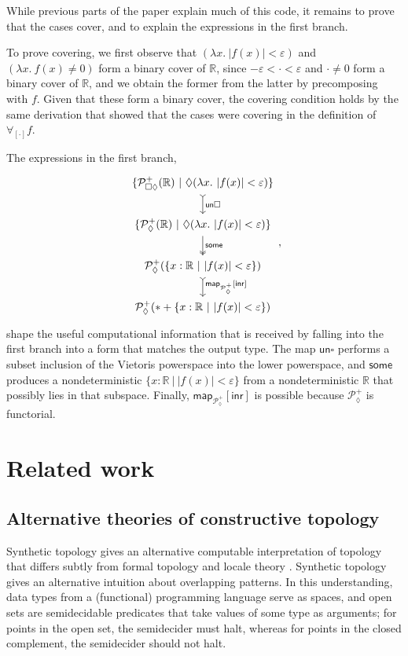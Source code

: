 \documentclass[conference]{IEEEtran}
\newcommand{\PLower}{\mathcal{P}_\lozenge}
\newcommand{\Viet}{\mathcal{P}_{\square\lozenge}}
\newcommand{\R}{\mathbb{R}}
\newcommand{\fun}[2]{\lambda {#1}.\  {#2}}
\newcommand{\suchthat}{\ |\ }
\newcommand{\One}{\ast}
\begin{document}
While previous parts of the paper explain much of this code, it remains to prove that the cases cover, and to explain the expressions in the first branch.

To prove covering, we first observe that  $(\fun{x}{|f(x)| < \varepsilon})$ and $(\fun{x}{f(x) \ne 0})$ form a binary cover of $\R$, since $- \varepsilon < \cdot < \varepsilon$ and $\cdot \neq 0$ form a binary cover of $\R$, and we obtain the former from the latter by precomposing with $f$. Given that these form a binary cover, the covering condition holds by the same derivation that showed that the cases were covering in the definition of $\forall_{[\cdot]}f$.

The expressions in the first branch,
\begin{equation*}
\begin{tikzcd}
\{ \Viet^+(\R) \suchthat \lozenge(\fun{x}{|f(x)| < \varepsilon}) \}
 \arrow[d, tail, "\mathsf{un}\square"]
\\ 
\{ \PLower^+(\R) \suchthat \lozenge(\fun{x}{|f(x)| < \varepsilon}) \}
 \arrow[d, two heads, "\mathsf{some}"]
\\ 
\PLower^+(\{x : \R \suchthat |f(x)| < \varepsilon \})
  \arrow[d, tail, "\mathsf{map}_{\PLower^+}{[\mathsf{inr}]}"]
\\
\PLower^+(\One + \{x : \R \suchthat |f(x)| < \varepsilon \})
\end{tikzcd},
\end{equation*}
shape the useful computational information that is received by falling into the first branch into a form that matches the output type. The map $\mathsf{un}\square$ performs a subset inclusion of the Vietoris powerspace into the lower powerspace, and $\mathsf{some}$ produces a nondeterministic $\{x : \R \suchthat |f(x)| < \varepsilon \}$ from a nondeterministic $\R$ that possibly lies in that subspace. Finally, $\mathsf{map}_{\PLower^+}[\mathsf{inr}]$ is possible because $\PLower^+$ is functorial.

\section{Related work}

\subsection{Alternative theories of constructive topology}

Synthetic topology gives an alternative computable interpretation of topology that differs subtly from formal topology and locale theory \cite{escardo2004, lesnik}. Synthetic topology gives an alternative intuition about overlapping patterns. In this understanding, data types from a (functional) programming language serve as spaces, and open sets are semidecidable predicates that take values of some type as arguments; for points in the open set, the semidecider must halt, whereas for points in the closed complement, the semidecider should not halt.
\end{document}
